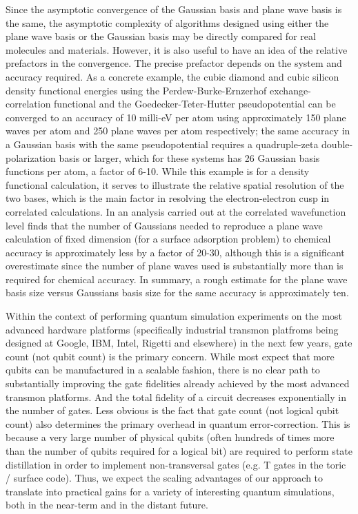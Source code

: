 \documentclass[superscriptaddress,aps,pra,nofootinbib,notitlepage,10pt,longbibliography]{revtex4-1}
\begin{document}
Since the asymptotic convergence of the Gaussian basis and plane wave basis is the same, the asymptotic complexity of algorithms designed using either the plane wave basis or the Gaussian basis may be directly compared for real molecules and materials. However, it is also useful to have an idea of the relative prefactors in the convergence. The precise prefactor depends on the system and accuracy required. As a concrete  example, the cubic diamond and cubic silicon density functional energies using the Perdew-Burke-Ernzerhof exchange-correlation functional and the Goedecker-Teter-Hutter pseudopotential can be converged to an accuracy of 10 milli-eV per atom using approximately 150 plane waves per atom and 250 plane waves per atom respectively; the same accuracy in a Gaussian basis with the same pseudopotential requires a quadruple-zeta double-polarization basis or larger, which for these systems has 26 Gaussian basis functions per atom, a factor of 6-10. While this example is for a density functional calculation, it serves to  illustrate the relative spatial resolution of the two bases, which is the main factor in resolving the electron-electron cusp in correlated calculations. In \cite{booth2016plane} an analysis carried out at the correlated wavefunction level finds that the number of Gaussians needed to reproduce a plane wave calculation of fixed dimension (for a surface adsorption problem) to chemical accuracy is approximately less by a factor of 20-30, although this is a significant overestimate since the number of plane waves used is substantially more than is required for chemical accuracy. In summary, a rough estimate for the plane wave basis size versus Gaussians basis size for the same accuracy is approximately ten.

Within the context of performing quantum simulation experiments on the most advanced hardware platforms (specifically industrial transmon platfroms being designed at Google, IBM, Intel, Rigetti and elsewhere) in the next few years, gate count (not qubit count) is the primary concern. While most expect that more qubits can be manufactured in a scalable fashion, there is no clear path to substantially improving the gate fidelities already achieved by the most advanced transmon platforms. And the total fidelity of a circuit decreases exponentially in the number of gates. Less obvious is the fact that gate count (not logical qubit count) also determines the primary overhead in quantum error-correction. This is because a very large number of physical qubits (often hundreds of times more than the number of qubits required for a logical bit) are required to perform state distillation in order to implement non-transversal gates (e.g. T gates in the toric / surface code). Thus, we expect the scaling advantages of our approach to translate into practical gains for a variety of interesting quantum simulations, both in the near-term and in the distant future.
\end{document}
